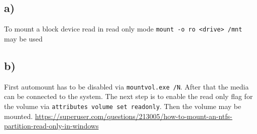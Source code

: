 \documentclass[10pt,a4paper]{article}
\begin{document}
\subsection{a)}
To mount a block device read in read only mode \Verb+mount -o ro <drive> /mnt+ may be used
\subsection{b)}
First automount has to be disabled via \Verb+mountvol.exe /N+. After that the media can be connected to the system. The next step is to enable the read only flag for the volume via \Verb+attributes volume set readonly+. Then the volume may be mounted.
\url{https://superuser.com/questions/213005/how-to-mount-an-ntfs-partition-read-only-in-windows}




\end{document}
